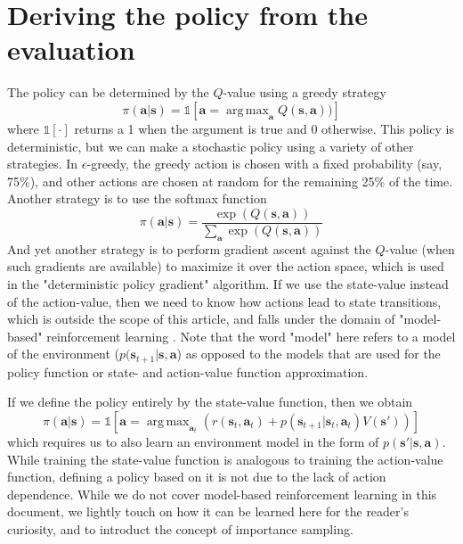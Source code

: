 \documentclass{article}
\DeclareMathOperator*{\argmax}{arg\,max}
\begin{document}
\section{Deriving the policy from the evaluation}
The policy can be determined by the $Q$-value using a greedy strategy
\begin{equation}\label{eq:greedy_policy}
    \pi(\mathbf{a}|\mathbf{s})=\mathbb{1}\left[\mathbf{a}=\argmax_\mathbf{a}Q(\mathbf{s},\mathbf{a}))\right]
\end{equation}where $\mathbb{1}[\cdot]$ returns a 1 when the argument is true and 0 otherwise. This policy is deterministic, but we can make a stochastic policy using a variety of other strategies. In $\epsilon$-greedy, the greedy action is chosen with a fixed probability (say, 75\%), and other actions are chosen at random for the remaining 25\% of the time. Another strategy is to use the softmax function
\begin{equation}
  \pi(\mathbf{a}|\mathbf{s})=\frac{\exp(Q(\mathbf{s},\mathbf{a}))}{\sum_\mathbf{a}\exp(Q(\mathbf{s},\mathbf{a}))}
\end{equation}And yet another strategy is to perform gradient ascent against the $Q$-value (when such gradients are available) to maximize it over the action space, which is used in the "deterministic policy gradient" algorithm\cite{DDPG}. If we use the state-value instead of the action-value, then we need to know how actions lead to state transitions, which is outside the scope of this article, and falls under the domain of "model-based" reinforcement learning \cite{model_based_rl_survey}. Note that the word "model" here refers to a model of the environment ($p(\mathbf{s}_{t+1}|\mathbf{s},\mathbf{a}$) as opposed to the models that are used for the policy function or state- and action-value function approximation.

If we define the policy entirely by the state-value function, then we obtain \begin{equation}\pi(\mathbf{a}|\mathbf{s})=\mathbb{1}\left[\mathbf{a}=\argmax_{\mathbf{a}_t}\left(r(\mathbf{s}_t,\mathbf{a}_t)+p(\mathbf{s}_{t+1}|\mathbf{s}_t,\mathbf{a}_t)V(\mathbf{s}')\right)\right]\end{equation}which requires us to also learn an environment model in the form of $p(\mathbf{s}'|\mathbf{s},\mathbf{a})$. While training the state-value function is analogous to training the action-value function, defining a policy based on it is not due to the lack of action dependence. While we do not cover model-based reinforcement learning in this document, we lightly touch on how it can be learned here for the reader's curiosity, and to introduct the concept of importance sampling. 
\end{document}
